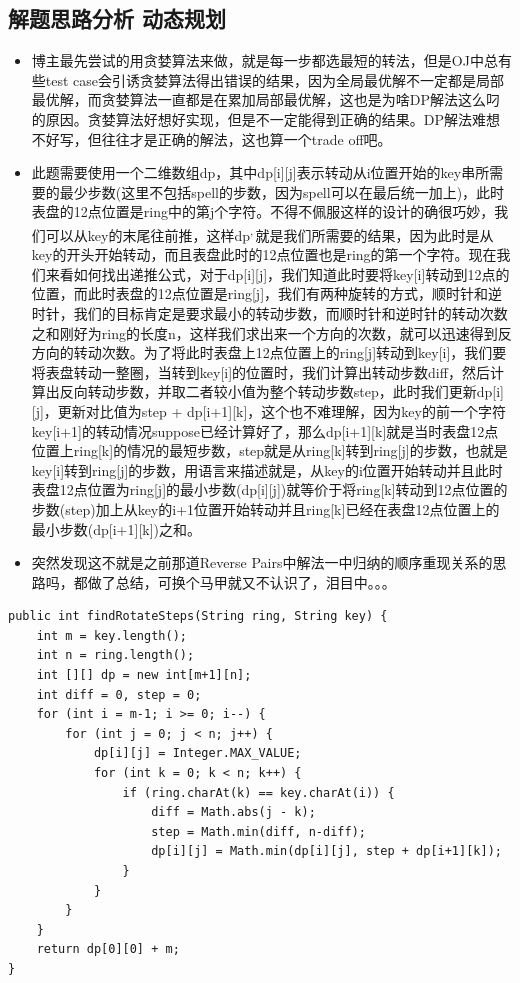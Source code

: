 \documentclass[9pt, b5paaper]{book}
\begin{document}
\subsection{解题思路分析 动态规划}
\label{sec-2-14-2}
\begin{itemize}
\item 博主最先尝试的用贪婪算法来做，就是每一步都选最短的转法，但是OJ中总有些test case会引诱贪婪算法得出错误的结果，因为全局最优解不一定都是局部最优解，而贪婪算法一直都是在累加局部最优解，这也是为啥DP解法这么叼的原因。贪婪算法好想好实现，但是不一定能得到正确的结果。DP解法难想不好写，但往往才是正确的解法，这也算一个trade off吧。
\item 此题需要使用一个二维数组dp，其中dp[i][j]表示转动从i位置开始的key串所需要的最少步数(这里不包括spell的步数，因为spell可以在最后统一加上)，此时表盘的12点位置是ring中的第j个字符。不得不佩服这样的设计的确很巧妙，我们可以从key的末尾往前推，这样dp\footnotemark[2]{}\textsuperscript{,}\,\footnotemark[2]{}就是我们所需要的结果，因为此时是从key的开头开始转动，而且表盘此时的12点位置也是ring的第一个字符。现在我们来看如何找出递推公式，对于dp[i][j]，我们知道此时要将key[i]转动到12点的位置，而此时表盘的12点位置是ring[j]，我们有两种旋转的方式，顺时针和逆时针，我们的目标肯定是要求最小的转动步数，而顺时针和逆时针的转动次数之和刚好为ring的长度n，这样我们求出来一个方向的次数，就可以迅速得到反方向的转动次数。为了将此时表盘上12点位置上的ring[j]转动到key[i]，我们要将表盘转动一整圈，当转到key[i]的位置时，我们计算出转动步数diff，然后计算出反向转动步数，并取二者较小值为整个转动步数step，此时我们更新dp[i][j]，更新对比值为step + dp[i+1][k]，这个也不难理解，因为key的前一个字符key[i+1]的转动情况suppose已经计算好了，那么dp[i+1][k]就是当时表盘12点位置上ring[k]的情况的最短步数，step就是从ring[k]转到ring[j]的步数，也就是key[i]转到ring[j]的步数，用语言来描述就是，从key的i位置开始转动并且此时表盘12点位置为ring[j]的最小步数(dp[i][j])就等价于将ring[k]转动到12点位置的步数(step)加上从key的i+1位置开始转动并且ring[k]已经在表盘12点位置上的最小步数(dp[i+1][k])之和。
\item 突然发现这不就是之前那道Reverse Pairs中解法一中归纳的顺序重现关系的思路吗，都做了总结，可换个马甲就又不认识了，泪目中。。。
\end{itemize}
\begin{verbatim}
public int findRotateSteps(String ring, String key) {
    int m = key.length(); 
    int n = ring.length();
    int [][] dp = new int[m+1][n];
    int diff = 0, step = 0;
    for (int i = m-1; i >= 0; i--) {
        for (int j = 0; j < n; j++) {
            dp[i][j] = Integer.MAX_VALUE;
            for (int k = 0; k < n; k++) {
                if (ring.charAt(k) == key.charAt(i)) {
                    diff = Math.abs(j - k);
                    step = Math.min(diff, n-diff);
                    dp[i][j] = Math.min(dp[i][j], step + dp[i+1][k]);
                }
            }
        }
    }
    return dp[0][0] + m;
}
\end{verbatim}
\end{document}

